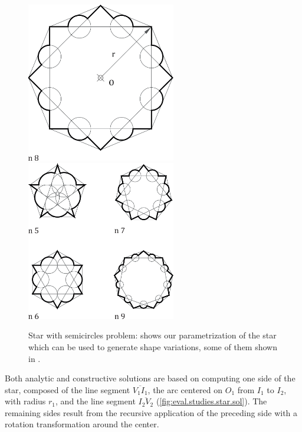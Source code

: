 \begin{figure}[htb]
  \centering
    {\includegraphics[height=7cm]{fig/star-problem-params}}
  \hfill
    {\includegraphics[height=7cm]{fig/star-problem-vars}}
  \caption[Star with semicircles problem]{Star with semicircles problem:
     shows our parametrization of
    the star which can be used to generate shape variations, some of them
    shown in .}%
  \label{fig:eval.studies.star.prob}
\end{figure}

Both analytic and constructive solutions are based on computing one side of the
star, composed of the line segment $\overline{V_1 I_1}$, the arc centered on
$O_1$ from $I_1$ to $I_2$, with radius $r_1$, and the line segment 
$\overline{I_2 V_2}$ (\cref{fig:eval.studies.star.sol}).  The remaining sides
result from the recursive application of the preceding side with a rotation
transformation around the center.

